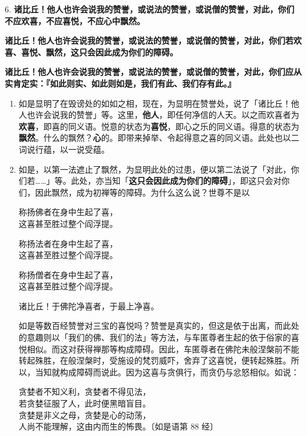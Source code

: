 {\Large 6.} \textbf{诸比丘！他人也许会说我的赞誉，或说法的赞誉，或说僧的赞誉，对此，你们不应欢喜，不应喜悦，不应心中飘然。}

\textbf{诸比丘！他人也许会说我的赞誉，或说法的赞誉，或说僧的赞誉，对此，你们若欢喜、喜悦、飘然，这只会因此成为你们的障碍。}

\textbf{诸比丘！他人也许会说我的赞誉，或说法的赞誉，或说僧的赞誉，对此，你们应从实肯定实：『如此则实、如此则如是，我们有此、我们存有此。』}

\begin{enumerate}\item 如是显明了在毁谤处的如如之相，现在，为显明在赞誉处，说了「诸比丘！他人也许会说我的赞誉」等。这里，\textbf{他人}，即任何净信的人天。以之而欢喜者为\textbf{欢喜}，即喜的同义语。悦意的状态为\textbf{喜悦}，即心之乐的同义语。得意的状态为\textbf{飘然}。什么的飘然？\textbf{心}的。即带来掉举、令起得意之喜的同义语。此处也以二词说行蕴，以一说受蕴。
\item 如是，以第一法遮止了飘然，为显明此处的过患，便以第二法说了「对此，你们若……」等。此处，亦当知「\textbf{这只会因此成为你们的障碍}」，即这只会对你们，因此飘然，成为初禅等的障碍。为什么这么说？世尊不是以\begin{quoting}称扬佛者在身中生起了喜，\\这喜甚至胜过整个阎浮提。\end{quoting}\begin{quoting}称扬法者在身中生起了喜，\\这喜甚至胜过整个阎浮提。\end{quoting}\begin{quoting}称扬僧者在身中生起了喜，\\这喜甚至胜过整个阎浮提。\end{quoting}\begin{quoting}诸比丘！于佛陀净喜者，于最上净喜。\end{quoting}如是等数百经赞誉对三宝的喜悦吗？赞誉是真实的，但这是依于出离，而此处的意趣则以「我们的佛、我们的法」等方法，与车匿尊者生起的依于俗家的喜悦相似。而这对获得禅那等构成障碍。因此，车匿尊者在佛陀未般涅槃前不能转起殊胜，在般涅槃时，受施设的梵罚威吓，舍弃了这喜悦，便转起殊胜。所以，当知就构成障碍而说此。因为这喜与贪俱行，而贪仍与忿怒相似。如说：\begin{quoting}贪婪者不知义利，贪婪者不得见法，\\若贪婪征服了人，此时便黑暗盲目。\\贪婪是非义之母，贪婪是心的动荡，\\人尚不能理解，这由内而生的怖畏。{\bluefootnotesize 〔如是语第 88 经〕}\end{quoting}

\end{enumerate}
